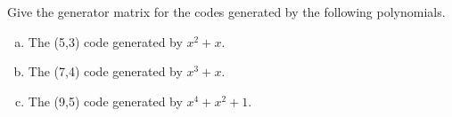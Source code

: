 \begin{exercise}{}
Give the generator matrix for the codes generated by the following polynomials.
\begin{enumerate}[(a)]
\item The (5,3) code generated by $x^2 + x$.
\item The (7,4) code generated by $x^3 + x $.
\item The (9,5) code generated by $x^4 + x^2 + 1$.
\end {enumerate}
\end {exercise}

%
%
%
%
%
%
